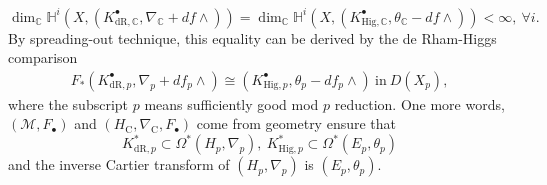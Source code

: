\documentclass[12pt, a4paper]{article}
\begin{document}
 $$
 \dim_\mathbb C\mathbb H^i(X,(K^\bullet_{\mathrm{dR},\mathbb C},\nabla_\mathbb{C}+df\wedge))=\dim_\mathbb C\mathbb H^i(X,(K^\bullet_{\mathrm{Hig},\mathbb C},\theta_\mathbb{C}-df\wedge))<\infty,~\forall i.
 $$
By spreading-out technique, this equality can be derived by the de Rham-Higgs comparison
\begin{eqnarray}\label{mod p de Rham-Higgs}
F_*(K^\bullet_{\mathrm{dR},p},\nabla_p+df_p\wedge)\cong(K^\bullet_{\mathrm{Hig},p},\theta_p-df_p\wedge)~\mathrm{in}~D(X_p),
\end{eqnarray}
 where the subscript $p$ means sufficiently good mod $p$ reduction. One more words, $(\mathcal M,F_\bullet)$ and $(H_\mathrm{C},\nabla_\mathrm{C},F_\bullet)$ come from geometry ensure that 
 $$
 K^*_{\mathrm{dR},p}\subset\Omega^*(H_p,\nabla_p),~K^*_{\mathrm{Hig},p}\subset\Omega^*(E_p,\theta_p)
 $$
and the inverse Cartier transform of $(H_p,\nabla_p)$ is $(E_p,\theta_p)$.
 
\end{document}
